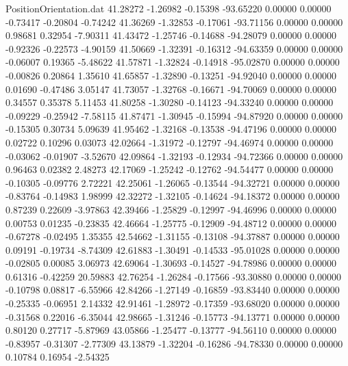 \begin{filecontents}{PositionOrientation.dat}
  41.28272   -1.26982   -0.15398   -93.65220    0.00000    0.00000   -0.73417   -0.20804   -0.74242
  41.36269   -1.32853   -0.17061   -93.71156    0.00000    0.00000    0.98681    0.32954   -7.90311
  41.43472   -1.25746   -0.14688   -94.28079    0.00000    0.00000   -0.92326   -0.22573   -4.90159
  41.50669   -1.32391   -0.16312   -94.63359    0.00000    0.00000   -0.06007    0.19365   -5.48622
  41.57871   -1.32824   -0.14918   -95.02870    0.00000    0.00000   -0.00826    0.20864    1.35610
  41.65857   -1.32890   -0.13251   -94.92040    0.00000    0.00000    0.01690   -0.47486    3.05147
  41.73057   -1.32768   -0.16671   -94.70069    0.00000    0.00000    0.34557    0.35378    5.11453
  41.80258   -1.30280   -0.14123   -94.33240    0.00000    0.00000   -0.09229   -0.25942   -7.58115
  41.87471   -1.30945   -0.15994   -94.87920    0.00000    0.00000   -0.15305    0.30734    5.09639
  41.95462   -1.32168   -0.13538   -94.47196    0.00000    0.00000    0.02722    0.10296    0.03073
  42.02664   -1.31972   -0.12797   -94.46974    0.00000    0.00000   -0.03062   -0.01907   -3.52670
  42.09864   -1.32193   -0.12934   -94.72366    0.00000    0.00000    0.96463    0.02382    2.48273
  42.17069   -1.25242   -0.12762   -94.54477    0.00000    0.00000   -0.10305   -0.09776    2.72221
  42.25061   -1.26065   -0.13544   -94.32721    0.00000    0.00000   -0.83764   -0.14983    1.98999
  42.32272   -1.32105   -0.14624   -94.18372    0.00000    0.00000    0.87239    0.22609   -3.97863
  42.39466   -1.25829   -0.12997   -94.46996    0.00000    0.00000    0.00753    0.01235   -0.23835
  42.46664   -1.25775   -0.12909   -94.48712    0.00000    0.00000   -0.67278   -0.02495    1.35355
  42.54662   -1.31155   -0.13108   -94.37887    0.00000    0.00000    0.09191   -0.19734   -8.74309
  42.61883   -1.30491   -0.14533   -95.01028    0.00000    0.00000   -0.02805    0.00085    3.06973
  42.69064   -1.30693   -0.14527   -94.78986    0.00000    0.00000    0.61316   -0.42259   20.59883
  42.76254   -1.26284   -0.17566   -93.30880    0.00000    0.00000   -0.10798    0.08817   -6.55966
  42.84266   -1.27149   -0.16859   -93.83440    0.00000    0.00000   -0.25335   -0.06951    2.14332
  42.91461   -1.28972   -0.17359   -93.68020    0.00000    0.00000   -0.31568    0.22016   -6.35044
  42.98665   -1.31246   -0.15773   -94.13771    0.00000    0.00000    0.80120    0.27717   -5.87969
  43.05866   -1.25477   -0.13777   -94.56110    0.00000    0.00000   -0.83957   -0.31307   -2.77309
  43.13879   -1.32204   -0.16286   -94.78330    0.00000    0.00000    0.10784    0.16954   -2.54325

\end{filecontents}

